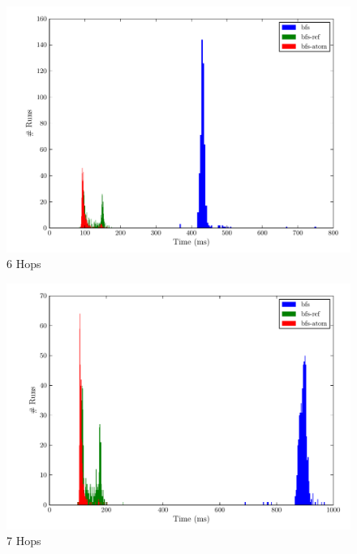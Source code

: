 \documentclass[12pt,letterpaper,oneside,notitlepage]{report}
\theoremstyle{definition}
\begin{document}
    \begin{figure}[!ht]
      \centering
      \includegraphics[scale=0.85]{6_hops}
      \caption{6 Hops}
      \label{fig:perf-6-hops}
    \end{figure}
    
    \begin{figure}[!ht]
      \centering
      \includegraphics[scale=0.85]{7_hops}
      \caption{7 Hops}
      \label{fig:perf-7-hops}
    \end{figure}
    
\end{document}
